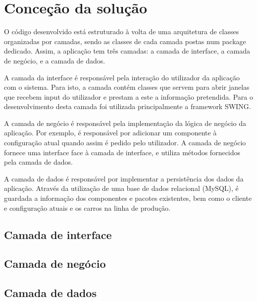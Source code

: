 \documentclass{llncs}
\begin{document}
\clearpage
\section{Conceção da solução} %

O código desenvolvido está estruturado à volta de uma arquitetura de classes organizadas por camadas, sendo as classes de cada camada postas num package dedicado. Assim, a aplicação tem três camadas: a camada de interface, a camada de negócio, e a camada de dados.

A camada da interface é responsável pela interação do utilizador da aplicação com o sistema. Para isto, a camada contém classes que servem para abrir janelas que recebem input do utilizador e prestam a este a informação pretendida. Para o desenvolvimento desta camada foi utilizada principalmente a framework SWING.

A camada de negócio é responsável pela implementação da lógica de negócio da aplicação. Por exemplo, é responsável por adicionar um componente à configuração atual quando assim é pedido pelo utilizador. A camada de negócio fornece uma interface face à camada de interface, e utiliza métodos fornecidos pela camada de dados.

A camada de dados é responsável por implementar a persistência dos dados da aplicação. Através da utilização de uma base de dados relacional (MySQL), é guardada a informação dos componentes e pacotes existentes, bem como o cliente e configuração atuais e os carros na linha de produção.

\subsection{Camada de interface}



\subsection{Camada de negócio}


\subsection{Camada de dados}
\end{document}
